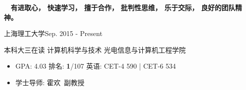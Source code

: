 \documentclass{sorahjy_cv}
\begin{document}
\pagestyle{empty}


\begin{cvHeader}
\end{cvHeader}


%
%

\begin{description}{}
	\item{\ \ }\textbf{有进取心， 快速学习， 擅于合作， 批判性思维， 乐于交际， 良好的团队精神。}
\end{description}


%
%

\begin{sectionContentSimple}{上海理工大学}{Sep. 2015 - Present}
	\item 本科大三在读 \quad 计算机科学与技术 \quad 光电信息与计算机工程学院
	\begin{itemize}
		\item GPA: 4.03 \quad 排名: \textbf{1}/107 \quad \quad 英语: CET-4 590 | CET-6 534
		\item 学士导师: 霍欢\ 副教授
	\end{itemize}
	
\end{sectionContentSimple}

%
%




\end{document}
